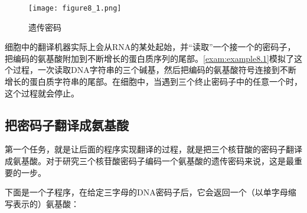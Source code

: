 \begin{figure}
  \centering
  \texttt{[image: figure8\_1.png]}
  \caption{遗传密码}
  \label{fig:figure8.1}
\end{figure}

细胞中的翻译机器实际上会从RNA的某处起始，并“读取”一个接一个的密码子，把编码的氨基酸附加到不断增长的蛋白质序列的尾部。\autoref{exam:example8.1}模拟了这个过程，一次读取DNA字符串的三个碱基，然后把编码的氨基酸符号连接到不断增长的蛋白质字符串的尾部。在细胞中，当遇到三个终止密码子中的任意一个时，这个过程就会停止。

\subsection{把密码子翻译成氨基酸}
第一个任务，就是让后面的程序实现翻译的过程，就是把三个核苷酸的密码子翻译成氨基酸。对于研究三个核苷酸密码子编码一个氨基酸的遗传密码来说，这是最重要的一步。

下面是一个子程序，在给定三字母的DNA密码子后，它会返回一个（以单字母缩写表示的）氨基酸：

